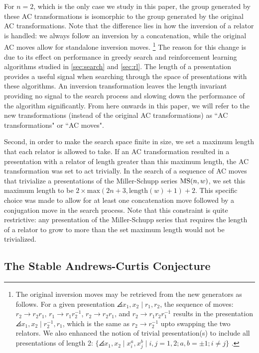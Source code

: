 For $n=2$, which is the only case we study in this paper, the group generated by these AC transformations is isomorphic to the group generated by the original AC transformations. Note that the difference lies in how the inversion of a relator is handled: we always follow an inversion by a concatenation, while the original AC moves allow for standalone inversion moves. 
\footnote{The original inversion moves may be retrieved from the new generators as follows. For a given presentation $\angles{x_1, x_2 \mid r_1, r_2}$, the sequence of moves: $r_2 \to r_2 r_1$, $r_1 \to r_1 r_2^{-1}$, $r_2 \to r_2 r_1$, and $r_2 \to r_1 r_2 r_1^{-1}$ results in the presentation $\angles{x_1, x_2 \mid r_2^{-1}, r_1}$, which is the same as $r_2 \to r_2^{-1}$ upto swapping the two relators. We also enhanced the notion of trivial presentation(s) to include all presentations of length 2: $\{\angles{x_1, x_2 \mid x_i^{a}, x_j^{b}}  \mid i, j = 1, 2; a, b = \pm 1; i \neq j \}$ .
}
The reason for this change is due to its effect on performance in greedy search and reinforcement learning algorithms studied in \autoref{sec:search} and \autoref{sec:rl}. The length of a presentation provides a useful signal when searching through the space of presentations with these algorithms. An inversion transformation leaves the length invariant providing no signal to the search process and slowing down the performance of the algorithm significantly. 
From here onwards in this paper, we will refer to the new transformations (instead of the original AC transformations) as  ``AC transformations" or ``AC moves".
\newline

Second, in order to make the search space finite in size, we set a maximum length that each relator is allowed to take. If an AC transformation resulted in a presentation with a relator of length greater than this maximum length, the AC transformation was set to act trivially. In the search of a sequence of AC moves that trivialize a presentations of the Miller-Schupp series $\text{MS}(n, w)$, we set this maximum length to be $2 \times \text{max}(2 n+3, \text{length}(w)+1) + 2$. This specific choice was made to allow for at least one concatenation move followed by a conjugation move in the search process. Note that this constraint is quite restrictive: any presentation of the Miller-Schupp series that requires the length of a relator to grow to more than the set maximum length would not be trivialized. 

\subsection{The Stable Andrews-Curtis Conjecture} \label{sec:stable_ac}

